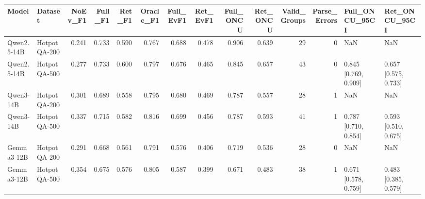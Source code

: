 \begin{tabular}{llrrrrrrrrrrll}
\toprule
Model & Dataset & NoEv_F1 & Full_F1 & Ret_F1 & Oracle_F1 & Full_EvF1 & Ret_EvF1 & Full_ONCU & Ret_ONCU & Valid_Groups & Parse_Errors & Full_ONCU_95CI & Ret_ONCU_95CI \\
\midrule
Qwen2.5-14B & HotpotQA-200 & 0.241 & 0.733 & 0.590 & 0.767 & 0.688 & 0.478 & 0.906 & 0.639 & 29 & 0 & NaN & NaN \\
Qwen2.5-14B & HotpotQA-500 & 0.277 & 0.733 & 0.600 & 0.797 & 0.676 & 0.465 & 0.845 & 0.657 & 43 & 0 & 0.845 [0.769, 0.909] & 0.657 [0.575, 0.733] \\
Qwen3-14B & HotpotQA-200 & 0.301 & 0.689 & 0.558 & 0.795 & 0.680 & 0.469 & 0.787 & 0.557 & 28 & 1 & NaN & NaN \\
Qwen3-14B & HotpotQA-500 & 0.337 & 0.715 & 0.582 & 0.816 & 0.699 & 0.456 & 0.787 & 0.593 & 41 & 1 & 0.787 [0.710, 0.854] & 0.593 [0.510, 0.675] \\
Gemma3-12B & HotpotQA-200 & 0.291 & 0.668 & 0.561 & 0.791 & 0.576 & 0.406 & 0.719 & 0.536 & 28 & 0 & NaN & NaN \\
Gemma3-12B & HotpotQA-500 & 0.354 & 0.675 & 0.576 & 0.805 & 0.587 & 0.399 & 0.671 & 0.483 & 38 & 1 & 0.671 [0.578, 0.759] & 0.483 [0.385, 0.579] \\
\bottomrule
\end{tabular}
